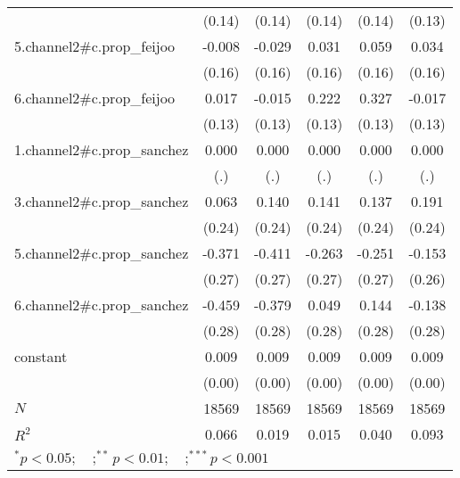 \begin{table}[htbp]
\begin{tabular}{l*{5}{c}}
            &      (0.14)         &      (0.14)         &      (0.14)         &      (0.14)         &      (0.13)         \\
5.channel2#c.prop\_feijoo&      -0.008         &      -0.029         &       0.031         &       0.059         &       0.034         \\
            &      (0.16)         &      (0.16)         &      (0.16)         &      (0.16)         &      (0.16)         \\
6.channel2#c.prop\_feijoo&       0.017         &      -0.015         &       0.222         &       0.327\sym{*}  &      -0.017         \\
            &      (0.13)         &      (0.13)         &      (0.13)         &      (0.13)         &      (0.13)         \\
1.channel2#c.prop\_sanchez&       0.000         &       0.000         &       0.000         &       0.000         &       0.000         \\
            &         (.)         &         (.)         &         (.)         &         (.)         &         (.)         \\
3.channel2#c.prop\_sanchez&       0.063         &       0.140         &       0.141         &       0.137         &       0.191         \\
            &      (0.24)         &      (0.24)         &      (0.24)         &      (0.24)         &      (0.24)         \\
5.channel2#c.prop\_sanchez&      -0.371         &      -0.411         &      -0.263         &      -0.251         &      -0.153         \\
            &      (0.27)         &      (0.27)         &      (0.27)         &      (0.27)         &      (0.26)         \\
6.channel2#c.prop\_sanchez&      -0.459         &      -0.379         &       0.049         &       0.144         &      -0.138         \\
            &      (0.28)         &      (0.28)         &      (0.28)         &      (0.28)         &      (0.28)         \\
constant    &       0.009\sym{***}&       0.009\sym{***}&       0.009\sym{***}&       0.009\sym{***}&       0.009\sym{***}\\
            &      (0.00)         &      (0.00)         &      (0.00)         &      (0.00)         &      (0.00)         \\
\midrule
\(N\)       &       18569         &       18569         &       18569         &       18569         &       18569         \\
\(R^{2}\)   &       0.066         &       0.019         &       0.015         &       0.040         &       0.093         \\
\bottomrule
\multicolumn{6}{l}{\footnotesize $^{*}p<0.05; \quad ; ^{**} p<0.01; \quad ; ^{***}p<0.001$}\\
\end{tabular}
\end{table}
